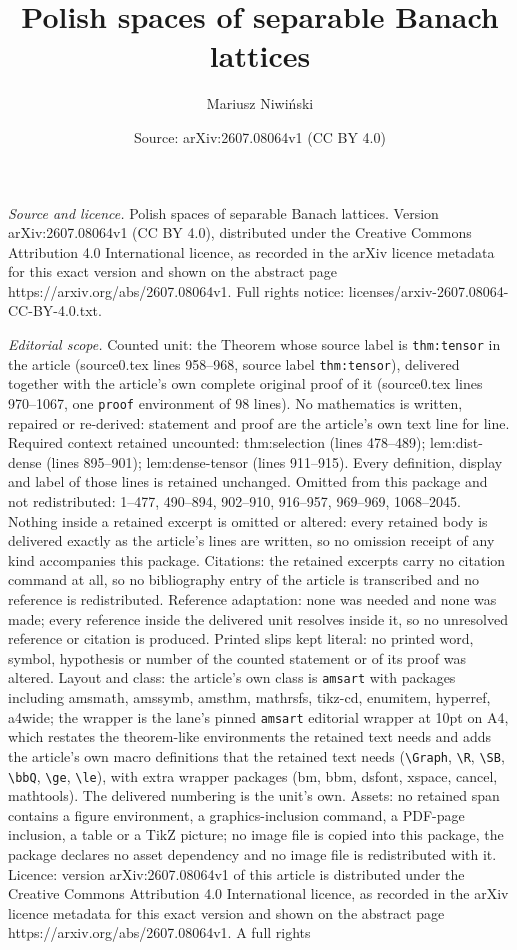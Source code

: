 \documentclass[10pt,a4paper]{amsart}
\title[Polish spaces of separable Banach lattices]{Polish spaces of separable Banach lattices}
\author{Mariusz Niwi\'nski}
\date{Source: arXiv:2607.08064v1 (CC BY 4.0)}
\begin{document}
\maketitle

\noindent\emph{Source and licence.} Polish spaces of separable Banach lattices. Version arXiv:2607.08064v1 (CC BY 4.0), distributed under the Creative Commons Attribution 4.0 International licence, as recorded in the arXiv licence metadata for this exact version and shown on the abstract page https://arxiv.org/abs/2607.08064v1. Full rights notice: licenses/arxiv-2607.08064-CC-BY-4.0.txt.\par\smallskip

\noindent\textit{Editorial scope.} Counted unit: the Theorem whose source label is \texttt{thm:tensor} in the article (source0.tex lines 958--968, source label \texttt{thm:tensor}), delivered together with the article's own complete original proof of it (source0.tex lines 970--1067, one \texttt{proof} environment of 98 lines). No mathematics is written, repaired or re-derived: statement and proof are the article's own text line for line. Required context retained uncounted: thm:selection (lines 478--489); lem:dist-dense (lines 895--901); lem:dense-tensor (lines 911--915). Every definition, display and label of those lines is retained unchanged. Omitted from this package and not redistributed: 1--477, 490--894, 902--910, 916--957, 969--969, 1068--2045. Nothing inside a retained excerpt is omitted or altered: every retained body is delivered exactly as the article's lines are written, so no omission receipt of any kind accompanies this package. Citations: the retained excerpts carry no citation command at all, so no bibliography entry of the article is transcribed and no reference is redistributed. Reference adaptation: none was needed and none was made; every reference inside the delivered unit resolves inside it, so no unresolved reference or citation is produced. Printed slips kept literal: no printed word, symbol, hypothesis or number of the counted statement or of its proof was altered. Layout and class: the article's own class is \texttt{amsart} with packages including amsmath, amssymb, amsthm, mathrsfs, tikz-cd, enumitem, hyperref, a4wide; the wrapper is the lane's pinned \texttt{amsart} editorial wrapper at 10pt on A4, which restates the theorem-like environments the retained text needs and adds the article's own macro definitions that the retained text needs (\texttt{\textbackslash Graph}, \texttt{\textbackslash R}, \texttt{\textbackslash SB}, \texttt{\textbackslash bbQ}, \texttt{\textbackslash ge}, \texttt{\textbackslash le}), with extra wrapper packages (bm, bbm, dsfont, xspace, cancel, mathtools). The delivered numbering is the unit's own. Assets: no retained span contains a figure environment, a graphics-inclusion command, a PDF-page inclusion, a table or a TikZ picture; no image file is copied into this package, the package declares no asset dependency and no image file is redistributed with it. Licence: version arXiv:2607.08064v1 of this article is distributed under the Creative Commons Attribution 4.0 International licence, as recorded in the arXiv licence metadata for this exact version and shown on the abstract page https://arxiv.org/abs/2607.08064v1. A full rights 
\end{document}
